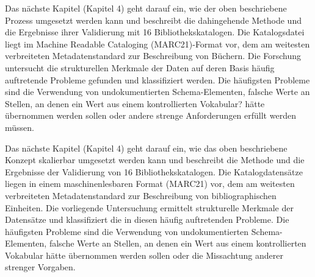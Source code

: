 Das nächste Kapitel (Kapitel 4) geht darauf ein, wie der oben beschriebene Prozess umgesetzt werden kann und beschreibt die dahingehende Methode und die Ergebnisse ihrer Validierung mit 16 Bibliothekskatalogen. Die Katalogsdatei liegt im Machine Readable Cataloging (MARC21)-Format vor, dem am weitesten verbreiteten Metadatenstandard zur Beschreibung von Büchern. Die Forschung untersucht die strukturellen Merkmale der Daten auf deren Basis häufig auftretende Probleme gefunden und klassifiziert werden. Die häufigsten Probleme sind die Verwendung von undokumentierten Schema-Elementen, falsche Werte an Stellen, an denen ein Wert aus einem kontrollierten Vokabular? hätte übernommen werden sollen oder andere strenge Anforderungen erfüllt werden müssen.

Das nächste Kapitel (Kapitel 4) geht darauf ein, wie das oben beschriebene Konzept skalierbar umgesetzt werden kann und beschreibt die Methode und die Ergebnisse der Validierung von 16 Bibliothekskatalogen. Die Katalogdatensätze liegen in einem maschinenlesbaren Format  (MARC21) vor, dem am weitesten verbreiteten Metadatenstandard zur Beschreibung von bibliographischen Einheiten. Die vorliegende Untersuchung ermittelt strukturelle Merkmale der Datensätze und klassifiziert die in diesen häufig auftretenden Probleme. Die häufigsten Probleme sind die Verwendung von undokumentierten Schema-Elementen, falsche Werte an Stellen, an denen ein Wert aus einem kontrollierten Vokabular hätte übernommen werden sollen oder die Missachtung anderer strenger Vorgaben.

